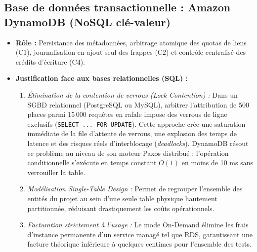 \subsection{Base de données transactionnelle : Amazon DynamoDB (NoSQL clé-valeur)}
\begin{itemize}
    \item \textbf{Rôle :} Persistance des métadonnées, arbitrage atomique des quotas de liens (C1), journalisation en ajout seul des frappes (C2) et contrôle centralisé des crédits d'écriture (C4).
    \item \textbf{Justification face aux bases relationnelles (SQL) :}
    \begin{enumerate}
        \item \emph{Élimination de la contention de verrous (Lock Contention) :} Dans un SGBD relationnel (PostgreSQL ou MySQL), arbitrer l'attribution de 500 places parmi 15\,000 requêtes en rafale impose des verrous de ligne exclusifs (\texttt{SELECT ... FOR UPDATE}). Cette approche crée une saturation immédiate de la file d'attente de verrous, une explosion des temps de latence et des risques réels d'interblocage (\emph{deadlocks}). DynamoDB résout ce problème au niveau de son moteur Paxos distribué : l'opération conditionnelle s'exécute en temps constant $O(1)$ en moins de 10 ms sans verrouiller la table.
        \item \emph{Modélisation Single-Table Design :} Permet de regrouper l'ensemble des entités du projet au sein d'une seule table physique hautement partitionnée, réduisant drastiquement les coûts opérationnels.
        \item \emph{Facturation strictement à l'usage :} Le mode On-Demand élimine les frais d'instance permanente d'un service managé tel que RDS, garantissant une facture théorique inférieure à quelques centimes pour l'ensemble des tests.
    \end{enumerate}
\end{itemize}

